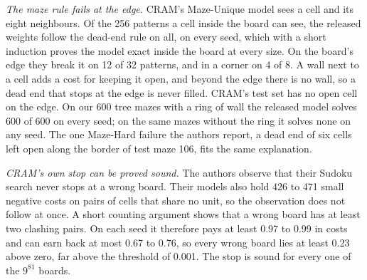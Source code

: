 \documentclass[10pt]{article}
\begin{document}
\emph{The maze rule fails at the edge.} CRAM's Maze-Unique model sees a cell and its eight neighbours. Of the
256 patterns a cell inside the board can see, the released weights follow the dead-end rule on all,
on every seed, which with a short induction proves the model exact inside the board at every size. On the board's edge
they break it on 12 of 32 patterns, and in a corner on 4 of
8. A wall next to a cell adds a cost for keeping it open, and beyond the edge there is no wall, so a
dead end that stops at the edge is never filled. CRAM's test set has no open cell on the edge. On our 600 tree
mazes with a ring of wall the released model solves 600 of 600 on every seed; on the same
mazes without the ring it solves none on any seed. The one Maze-Hard failure the authors report, a dead end of six
cells left open along the border of test maze 106, fits the same explanation.

\emph{CRAM's own stop can be proved sound.} The authors observe that their Sudoku search never stops at a wrong board.
Their models also hold 426 to 471 small negative costs on pairs of cells that share no unit, so
the observation does not follow at once. A short counting argument shows that a wrong board has at least two clashing
pairs. On each seed it therefore pays at least 0.97 to 0.99 in costs and can earn back
at most 0.67 to 0.76, so every wrong board lies at least 0.23
above zero, far above the threshold of 0.001. The stop is sound for every one of the $9^{81}$ boards.
\end{document}
